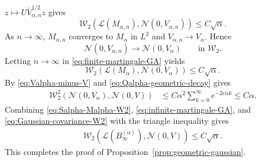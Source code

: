 \documentclass[11pt,letterpaper]{article}
\theoremstyle{plain}
\theoremstyle{definition}
\theoremstyle{remark}
\newcommand{\W}{\mathcal{W}}
\newcommand{\law}{\mathcal{L}}
\begin{document}
\(z\mapsto U\overline V_{\alpha,n}^{1/2}z\) gives
\begin{equation}
\label{eq:finite-martingale-GA}
    \W_2\left(
        \law(M_{\alpha,n}),
        \mathcal N(0,V_{\alpha,n})
    \right)
    \leq
    C\sqrt{\alpha}.
\end{equation}
As \(n\to\infty\), $M_{\alpha,n}$ converges to $M_\alpha$ in $L^2$ and $V_{\alpha,n}\to  V_\alpha.$ Hence
\[
    \mathcal N(0,V_{\alpha,n})
    \longrightarrow
    \mathcal N(0,V_\alpha)
    \qquad\text{in }\W_2.
\]
Letting \(n\to\infty\) in \eqref{eq:finite-martingale-GA} yields
\begin{equation}
\label{eq:infinite-martingale-GA}
    \W_2\left(
        \law(M_\alpha),
        \mathcal N(0,V_\alpha)
    \right)
    \leq
    C\sqrt{\alpha}.
\end{equation}
By \eqref{eq:Valpha-minus-V} and
\eqref{eq:Qalpha-geometric-decay} gives
\begin{align}
    \W_2^2\left(
        \mathcal N(0,V_\alpha),
        \mathcal N(0,V)
    \right)
    &\leq
    C\alpha^2
    \sum_{k=0}^{\infty}e^{-2c\alpha k}
    \leq
    C\alpha.
\label{eq:Gaussian-covariance-W2}
\end{align}
Combining
\eqref{eq:Salpha-Malpha-W2},
\eqref{eq:infinite-martingale-GA}, and
\eqref{eq:Gaussian-covariance-W2} with the triangle inequality gives
\begin{align*}
    \W_2\left(
        \law(B_\infty^{(\alpha)}),
        \mathcal N(0,V)
    \right)\leq
    C\sqrt{\alpha}.
\end{align*}
This completes the proof of Proposition~\ref{prop:geometric-gaussian}.
\end{document}
